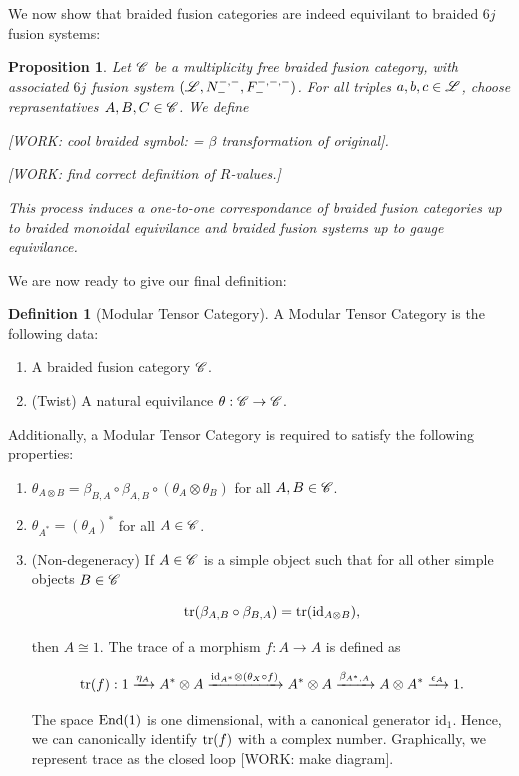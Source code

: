 \documentclass{article}
\newtheorem{proposition}{Proposition}[section]
\theoremstyle{definition}
\newtheorem*{definition}{Definition}
\numberwithin{figure}{section}
\begin{document}
We now show that braided fusion categories are indeed equivilant to braided $6j$ fusion systems:

\begin{proposition}\label{Make braided system} Let $\mathscr{C}$ be a multiplicity free braided fusion category, with associated $6j$ fusion system $(\mathscr{L},N^{\--,\--}_{\--},F^{\--,\--,\--}_{\--})$.  For all triples $a,b,c\in \mathscr{L}$, choose reprasentatives $A,B,C\in \mathscr{C}$. We define

[WORK: cool braided symbol: = $\beta$ transformation of original].

[WORK: find correct definition of $R$-values.]

This process induces a one-to-one correspondance of braided fusion categories up to braided monoidal equivilance and braided fusion systems up to gauge equivilance.
\end{proposition}

We are now ready to give our final definition:

\begin{definition}[Modular Tensor Category] A Modular Tensor Category is the following data:

\begin{enumerate}
\item A braided fusion category $\mathscr{C}$.
\item (Twist) A natural equivilance $\theta:\mathscr{C} \to \mathscr{C}$.
\end{enumerate}

Additionally, a Modular Tensor Category is required to satisfy the following properties:

\begin{enumerate}
\item $\theta_{A\otimes B}=\beta_{B,A}\circ \beta_{A,B}\circ (\theta_{A}\otimes \theta_{B})$ for all $A,B\in \mathscr{C}$.
\item $\theta_{A^*}=\left(\theta_A\right)^*$ for all $A\in \mathscr{C}$.
\item (Non-degeneracy) If $A\in \mathscr{C}$ is a simple object such that for all other simple objects $B\in \mathscr{C}$

$$\mathrm{tr}(\beta_{A,B}\circ \beta_{B,A})=\mathrm{tr}(\mathrm{id}_{A\otimes B}),$$

then $A\cong 1$. The trace of a morphism $f:A\to A$ is defined as

$$\mathrm{tr}(f): 1\xrightarrow{\eta_A} A^*\otimes A\xrightarrow{\text{id}_{A^*}\otimes (\theta_X\circ f)} A^*\otimes A \xrightarrow{\beta_{A^*,A}}A\otimes A^*\xrightarrow{\epsilon_A}1.$$

The space $\mathrm{End}(1)$ is one dimensional, with a canonical generator $\text{id}_1$. Hence, we can canonically identify $\mathrm{tr}(f)$ with a complex number. Graphically, we represent trace as the closed loop [WORK: make diagram].
\end{enumerate}
\raggedleft\qedsymbol{}
\end{definition}
\end{document}
